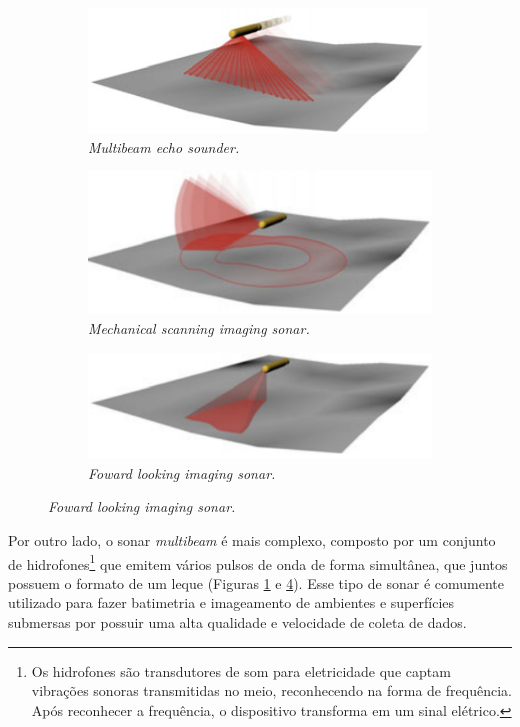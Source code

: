 \begin{figure}[H]
\begin{subfigure}[t]{0.4\textwidth}
        \includegraphics[width=\textwidth]{dados/figuras/multibeam.png}
        \caption{\textit{Multibeam echo sounder.}}
        \label{fig:multi-prof-sonar}
    \end{subfigure}
    \begin{subfigure}[t]{0.4\textwidth}
        \includegraphics[width=\textwidth]{dados/figuras/msis.png}
        \caption{\textit{Mechanical scanning imaging sonar.}}
        \label{fig:msis}
    \end{subfigure}
    \begin{subfigure}[t]{0.4\textwidth}
        \includegraphics[width=\textwidth]{dados/figuras/fls.png}
        \caption{\textit{Foward looking imaging sonar.}}
        \label{fig:fls}
    \end{subfigure}
\end{figure}

Por outro lado, o sonar \textit{multibeam} é mais complexo, composto por um conjunto de hidrofones\footnote{Os hidrofones são transdutores de som para eletricidade que captam vibrações sonoras transmitidas no meio, reconhecendo na forma de frequência. Após reconhecer a frequência, o dispositivo transforma em um sinal elétrico.} que emitem vários pulsos de onda de forma simultânea, que juntos possuem o formato de um leque (Figuras \ref{fig:multi-prof-sonar} e \ref{fig:fls}). Esse tipo de sonar é comumente utilizado para fazer batimetria e imageamento de ambientes e superfícies submersas por possuir uma alta qualidade e velocidade de coleta de dados.

